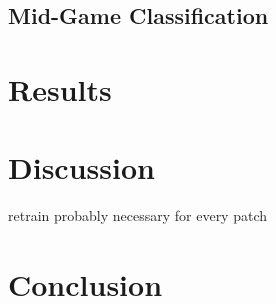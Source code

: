 \documentclass[12pt, a4paper, headinclude, twoside, plainheadsepline, open=right, numbers=noenddot, hidelinks, toc=listof, toc=bibliography]{scrreprt}
\begin{document}
\section{Mid-Game Classification}
\label{sec:midgame_class}



\chapter{Results}
\label{chap:results}


\chapter{Discussion}
\label{chap:discussion}

retrain probably necessary for every patch


\chapter{Conclusion}
\label{chap:conclusion}

%
%
%
\printbibliography






\listoffigures																			%
\listoftables																			%
\cleardoublepage{}	%
\printacronyms[heading={chapter*}, name={List of Abbreviations}]
\end{document}
